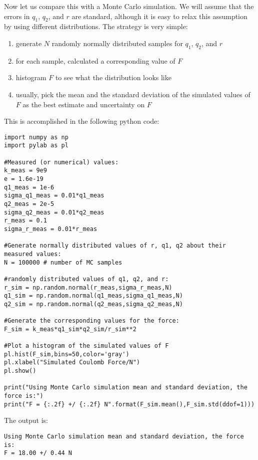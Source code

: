 Now let us compare this with a Monte Carlo simulation. We will assume that the errors in $q_1$, $q_2$, and $r$ are standard, although it is easy to relax this assumption by using different distributions. The strategy is very simple:
\begin{enumerate}
\item generate $N$ randomly normally distributed samples for $q_1$, $q_2$, and $r$
\item for each sample, calculated a corresponding value of $F$
\item histogram $F$ to see what the distribution looks like
\item usually, pick the mean and the standard deviation of the simulated values of $F$ as the best estimate and uncertainty on $F$
\end{enumerate}
This is accomplished in the following python code:
\begin{lstlisting}[frame=single] 
import numpy as np
import pylab as pl

#Measured (or numerical) values:
k_meas = 9e9
e = 1.6e-19
q1_meas = 1e-6
sigma_q1_meas = 0.01*q1_meas
q2_meas = 2e-5
sigma_q2_meas = 0.01*q2_meas
r_meas = 0.1
sigma_r_meas = 0.01*r_meas

#Generate normally distributed values of r, q1, q2 about their measured values:
N = 100000 # number of MC samples

#randomly distributed values of q1, q2, and r:
r_sim = np.random.normal(r_meas,sigma_r_meas,N)
q1_sim = np.random.normal(q1_meas,sigma_q1_meas,N)
q2_sim = np.random.normal(q2_meas,sigma_q2_meas,N)

#Generate the corresponding values for the force:
F_sim = k_meas*q1_sim*q2_sim/r_sim**2

#Plot a histogram of the simulated values of F
pl.hist(F_sim,bins=50,color='gray')
pl.xlabel("Simulated Coulomb Force/N")
pl.show()

print("Using Monte Carlo simulation mean and standard deviation, the force is:")
print("F = {:.2f} +/ {:.2f} N".format(F_sim.mean(),F_sim.std(ddof=1)))
\end{lstlisting}
The output is:
\begin{verbatim}
Using Monte Carlo simulation mean and standard deviation, the force is:
F = 18.00 +/ 0.44 N
\end{verbatim}

